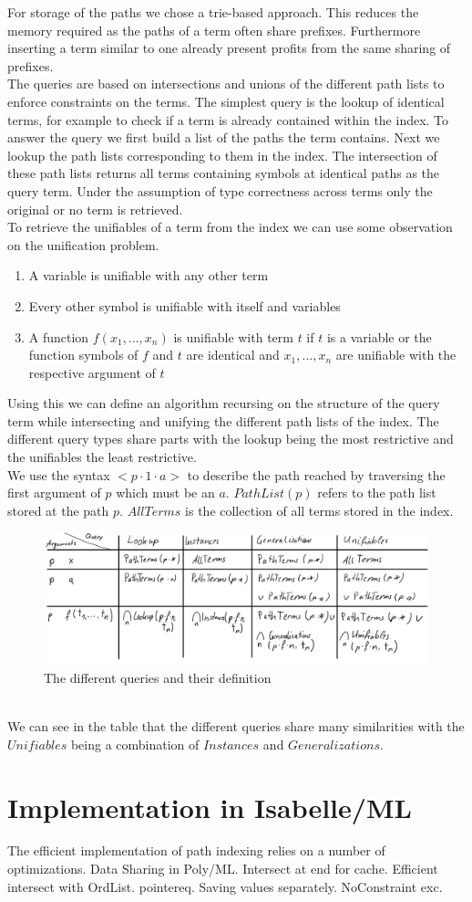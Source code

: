 For storage of the paths we chose a trie-based approach. This reduces the memory required as the paths of a term often share prefixes. Furthermore inserting a term similar to one already present profits from the same sharing of prefixes.\\
The queries are based on intersections and unions of the different path lists to enforce constraints on the terms. The simplest query is the lookup of identical terms, for example to check if a term is already contained within the index. To answer the query we first build a list of the paths the term contains. Next we lookup the path lists corresponding to them in the index. The intersection of these path lists returns all terms containing symbols at identical paths as the query term. Under the assumption of type correctness across terms only the original or no term is retrieved.\\
To retrieve the unifiables of a term from the index we can use some observation on the unification problem.
\begin{enumerate}
  \item A variable is unifiable with any other term
  \item Every other symbol is unifiable with itself and variables
  \item A function $f(x_{1},...,x_{n})$ is unifiable with term $t$ if $t$ is a variable or the function symbols of $f$ and $t$ are identical and $x_{1},...,x_{n}$ are unifiable with the respective argument of $t$
\end{enumerate}
Using this we can define an algorithm recursing on the structure of the query term while intersecting and unifying the different path lists of the index. The different query types share parts with the lookup being the most restrictive and the unifiables the least restrictive.\\
We use the syntax $<p \cdot 1 \cdot a>$ to describe the path reached by traversing the first argument of $p$ which must be an $a$. $PathList(p)$ refers to the path list stored at the path $p$. $AllTerms$ is the collection of all terms stored in the index.
\begin{figure}[h]
\centering
\includegraphics[scale=0.25]{figures/queries.png}
\caption{The different queries and their definition}
\end{figure}\\
We can see in the table that the different queries share many similarities with the $Unifiables$ being a combination of $Instances$ and $Generalizations$.

\section{Implementation in Isabelle/ML}
The efficient implementation of path indexing relies on a number of optimizations. Data Sharing in Poly/ML. Intersect at end for cache. Efficient intersect with OrdList. pointereq. Saving values separately. NoConstraint exc.
